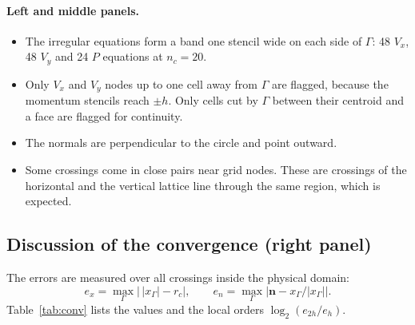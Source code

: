 \documentclass[11pt,a4paper]{article}
\begin{document}
\paragraph{Left and middle panels.}
\begin{itemize}
  \item The irregular equations form a band one stencil wide on each side of $\Gamma$: 48
    $V_x$, 48 $V_y$ and 24 $P$ equations at $n_c=20$.
  \item Only $V_x$ and $V_y$ nodes up to one cell away from $\Gamma$ are flagged, because the
    momentum stencils reach $\pm h$. Only cells cut by $\Gamma$ between their centroid and a
    face are flagged for continuity.
  \item The normals are perpendicular to the circle and point outward.
  \item Some crossings come in close pairs near grid nodes. These are crossings of the
    horizontal and the vertical lattice line through the same region, which is expected.
\end{itemize}

\subsection*{Discussion of the convergence (right panel)}

The errors are measured over all crossings inside the physical domain:
\[
e_x=\max_\Gamma\bigl|\,|x_\Gamma|-r_c\bigr|,\qquad
e_n=\max_\Gamma\bigl|\mathbf n-x_\Gamma/|x_\Gamma|\bigr|.
\]
Table~\ref{tab:conv} lists the values and the local orders $\log_2(e_{2h}/e_h)$.
\end{document}
